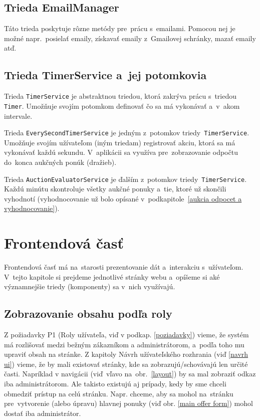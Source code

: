 \subsection{Trieda EmailManager}
\label{trieda emailmanager}

Táto trieda poskytuje rôzne metódy pre~prácu s~emailami. Pomocou nej je možné napr.~posielať emaily, získavať emaily z~Gmailovej schránky, mazať emaily atď.

\subsection{Trieda TimerService a~jej potomkovia}
\label{trieda timerservice}

Trieda \verb|TimerService| je abstraktnou triedou, ktorá zakrýva prácu s~triedou \verb|Timer|. Umožňuje svojím potomkom definovať čo sa má vykonávať a~v~akom intervale.

Trieda \verb|EverySecondTimerService| je jedným z~potomkov triedy~\verb|TimerService|. Umožňuje svojím užívateľom (iným triedam) registrovať akciu, ktorá sa má vykonávať každú sekundu. V~aplikácii sa využíva pre~zobrazovanie odpočtu do~konca aukčných ponúk (dražieb).

Trieda \verb|AuctionEvaluatorService| je ďalším z~potomkov triedy~\verb|TimerService|. Každú minútu skontroluje všetky aukčné ponuky a~tie, ktoré už skončili vyhodnotí (vyhodnocovanie už bolo opísané v~podkapitole~\ref{aukcia odpocet a vyhodnocovanie}).

\section{Frontendová časť}

Frontendová časť má na~starosti prezentovanie dát a~interakciu s~užívateľom. V~tejto kapitole si prejdeme jednotlivé stránky webu a~opíšeme si aké významnejšie triedy (komponenty) sa v~nich využívajú.

\subsection{Zobrazovanie obsahu podľa roly}
\label{zobrazovanie obsahu podla roly}

Z požiadavky P1 (Roly užívateľa, viď v podkap. \ref{poziadavky}) vieme, že systém má rozlišovať medzi bežným zákazníkom a administrátorom, a~podľa toho mu upraviť obsah na stránke. Z kapitoly Návrh užívateľského rozhrania (viď \ref{navrh ui}) vieme, že by mali existovať stránky, kde sa zobrazujú/schovávajú len určité časti. Napríklad v navigácii (viď~vľavo na~obr.~\ref{layout}) by sa mal zobraziť odkaz  iba administrátorom. Ale takisto existujú aj prípady, kedy by sme chceli obmedziť prístup na celú stránku. Napr. chceme, aby sa mohol na~stránku pre~vytvorenie (alebo úpravu) hlavnej ponuky (viď obr. \ref{main offer form}) mohol dostať iba administrátor.

